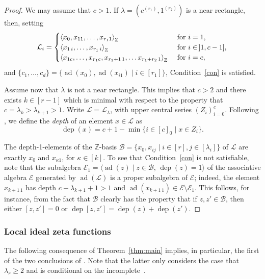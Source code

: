 \documentclass[11pt]{amsart}
\numberwithin{equation}{section}
\numberwithin{figure}{section}
\theoremstyle{plain}
\theoremstyle{definition}
\theoremstyle{remark}
\begin{document}
\begin{proof}
 We may assume that $c>1$. If $\lambda = (c^{(r_1)},1^{(r_2)})$ is a
 near rectangle, then, setting
$${\ensuremath{\mathcal{L}}}_i = \begin{cases} {\langle} x_0,x_{11},\dots,x_{r_11}{\rangle}_{\ensuremath{\mathbb{Z}}} &
   \textup{ for } i=1,\\ {\langle} x_{1\,i},\dots,x_{r_1\,i}{\rangle}_{\ensuremath{\mathbb{Z}}} &
   \textup{ for } i\in\, ]1,c-1],\\ {\langle} x_{1c},\dots,x_{r_1c},x_{r_1+1\,1},\dots
  x_{r_1+r_2\, 1}{\rangle}_{\ensuremath{\mathbb{Z}}} & \textup{ for } i=c,\end{cases}$$ and
 $\{c_1,\dots,c_d\} = \{\operatorname{ad}(x_0),\operatorname{ad}(x_{i1}) \mid i\in[r_1]\}$,
 Condition~\ref{con} is satisfied.

Assume now that $\lambda$ is not a near rectangle. This implies that
$c>2$ and there exists $k\in[r-1]$ which is minimal with respect to
the property that $c = \lambda_k > \lambda_{k+1}>1$. Write ${\ensuremath{\mathcal{L}}} =
{\ensuremath{\mathcal{L}}}_{\lambda}$, with upper central series $(Z_i)_{i=0}^c$. Following
\cite[Definition~4.49]{duSWoodward/08}, we define the \emph{depth} of
an element $x\in{\ensuremath{\mathcal{L}}}$ as
$$\operatorname{dep}(x) = c+1 - \min\{ i\in [c]_0 \mid x \in Z_i\}.$$ 

The depth-1-elements of the ${\ensuremath{\mathbb{Z}}}$-basis ${\mathcal{B}} = \{ x_0, x_{ij} \mid
i\in [r], j\in [\lambda_i] \}$ of ${\ensuremath{\mathcal{L}}}$ are exactly $x_0$ and
$x_{\kappa 1}$, for $\kappa\in [k]$. To see that Condition~\ref{con} is
not satisfiable, note that the subalgebra ${\mathcal{E}}_1 = {\langle} \operatorname{ad}(z) \mid
z\in {\mathcal{B}}, \,\operatorname{dep}(z)=1{\rangle}$ of the associative algebra ${\mathcal{E}}$ generated
by $\operatorname{ad}({\ensuremath{\mathcal{L}}})$ is a proper subalgebra of ${\mathcal{E}}$; indeed, the element
$x_{k+1\, 1}$ has depth $c-\lambda_{k+1}+1>1$ and
$\operatorname{ad}(x_{k+1\, 1})\in{\mathcal{E}} \setminus {\mathcal{E}}_1$. This follows, for instance,
from the fact that ${\mathcal{B}}$ clearly has the property that if $z,z'\in
{\mathcal{B}}$, then either $[z,z']=0$ or $\operatorname{dep}[z,z'] = \operatorname{dep}(z) + \operatorname{dep}(z')$.
\end{proof}

\subsubsection{Local ideal zeta functions}
The following consequence of Theorem~\ref{thm:main} implies, in
particular, the first of the two conclusions of
\cite[Proposition~4.75]{duSWoodward/08}. Note that the latter only
considers the case that $\lambda_r\geq 2$ and is conditional on the
incomplete~\cite[Conjecture~4.5]{duSWoodward/08}.
\end{document}
